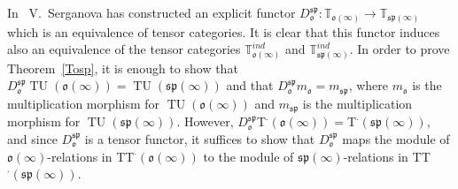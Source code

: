 \documentclass{emsprocart}
\begin{document}
In~\cite{S} V.~Serganova has constructed an explicit functor $D_\mathfrak o^{\mathfrak{sp}}: \mathbb T_{\mathfrak o(\infty)}\to\mathbb T_{\mathfrak{sp}(\infty)}$ which is an equivalence of tensor categories. It is clear that this functor induces also an equivalence of the tensor categories $\mathbb T_{\mathfrak o(\infty)}^{ind}$ and $\mathbb T_{\mathfrak{sp}(\infty)}^{ind}$.
In order to prove Theorem~\ref{Tosp}, it is enough to show that $D_{\mathfrak o}^{\mathfrak{sp}}\operatorname{TU}(\mathfrak o(\infty))=\operatorname{TU}(\mathfrak{sp}(\infty))$ and that $D_\mathfrak o^{\mathfrak{sp}}m_\mathfrak o=m_{\mathfrak{sp}}$, where $m_\mathfrak o$ is the multiplication morphism for $\operatorname{TU}(\mathfrak o(\infty))$ and $m_{\mathfrak{sp}}$ is the multiplication morphism for $\operatorname{TU}(\mathfrak{sp}(\infty))$.
However, $D_\mathfrak o^\mathfrak{sp}$T$^\cdot(\mathfrak o(\infty))=$T$^\cdot(\mathfrak{sp}(\infty))$, and since $D_\mathfrak o^\mathfrak{sp}$ is a tensor functor, it suffices to show that $D_{\mathfrak o}^{\mathfrak{sp}}$ maps the module of $\mathfrak o(\infty)$-relations in TT$^\cdot(\mathfrak o(\infty))$ to the module of $\mathfrak{sp}(\infty)$-relations in TT$^\cdot(\mathfrak{sp}(\infty))$.
\end{document}
